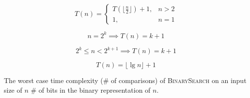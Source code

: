 \begin{frame}{}
  \[
    T(n) = \left\{\begin{array}{lr}
      T(\lfloor \frac{n}{2} \rfloor) + 1, & n > 2 \\
      1, & n = 1
    \end{array}\right.
  \]

  \pause
  \vspace{0.30cm}
  \[
    n = 2^k \implies T(n) = k + 1
  \]

  \pause
  \vspace{0.30cm}
  \[
    2^k \le n < 2^{k+1} \implies T(n) = k + 1
  \]

  \pause
  \vspace{0.30cm}
  \[
    T(n) = \lfloor \lg n \rfloor + 1
  \]

  \begin{theorem}
    The worst case time complexity (\# of comparisons) of \textsc{BinarySearch} on an input size of $n$ \red{\bf $=$} \# of bits in the binary representation of $n$.
  \end{theorem}
\end{frame}
